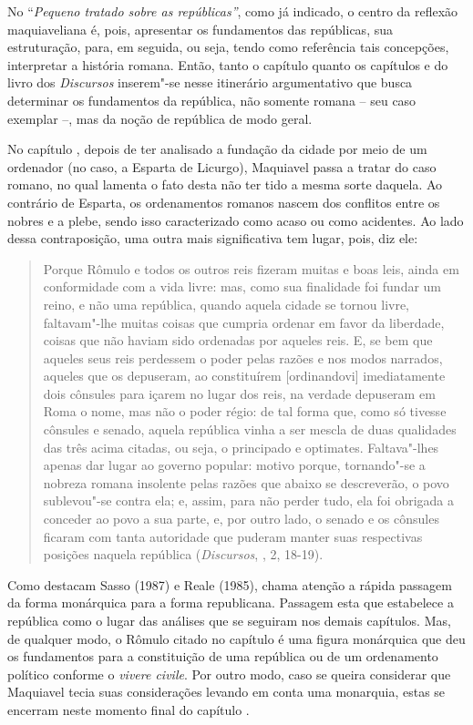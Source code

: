 No ``\emph{Pequeno tratado sobre as repúblicas''}, como já indicado, o
centro da reflexão maquiaveliana é, pois, apresentar os fundamentos das
repúblicas, sua estruturação, para, em seguida, ou seja, tendo como
referência tais concepções, interpretar a história romana. Então, tanto
o capítulo  quanto os capítulos  e  do livro dos \emph{Discursos}
inserem"-se nesse itinerário argumentativo que busca determinar os
fundamentos da república, não somente romana -- seu caso exemplar --,
mas da noção de república de modo geral.

No capítulo , depois de ter analisado a fundação da cidade por meio de
um ordenador (no caso, a Esparta de Licurgo), Maquiavel passa a tratar
do caso romano, no qual lamenta o fato desta não ter tido a mesma sorte
daquela. Ao contrário de Esparta, os ordenamentos romanos nascem dos
conflitos entre os nobres e a plebe, sendo isso caracterizado como acaso
ou como acidentes. Ao lado dessa contraposição, uma outra mais
significativa tem lugar, pois, diz ele:

\begin{quote}
Porque Rômulo e todos os outros reis fizeram muitas e boas leis, ainda
em conformidade com a vida livre: mas, como sua finalidade foi fundar um
reino, e não uma república, quando aquela cidade se tornou livre,
faltavam"-lhe muitas coisas que cumpria ordenar em favor da liberdade,
coisas que não haviam sido ordenadas por aqueles reis. E, se bem que
aqueles seus reis perdessem o poder pelas razões e nos modos narrados,
aqueles que os depuseram, ao constituírem {[}ordinandovi{]}
imediatamente dois cônsules para içarem no lugar dos reis, na verdade
depuseram em Roma o nome, mas não o poder régio: de tal forma que, como
só tivesse cônsules e senado, aquela república vinha a ser mescla de
duas qualidades das três acima citadas, ou seja, o principado e
optimates. Faltava"-lhes apenas dar lugar ao governo popular: motivo
porque, tornando"-se a nobreza romana insolente pelas razões que abaixo
se descreverão, o povo sublevou"-se contra ela; e, assim, para não perder
tudo, ela foi obrigada a conceder ao povo a sua parte, e, por outro
lado, o senado e os cônsules ficaram com tanta autoridade que puderam
manter suas respectivas posições naquela república (\emph{Discursos},
, 2, 18-19).
\end{quote}

Como destacam Sasso (1987) e Reale (1985), chama atenção a rápida
passagem da forma monárquica para a forma republicana. Passagem esta que
estabelece a república como o lugar das análises que se seguiram nos
demais capítulos. Mas, de qualquer modo, o Rômulo citado no capítulo 
é uma figura monárquica que deu os fundamentos para a constituição de
uma república ou de um ordenamento político conforme o \emph{vivere
civile}. Por outro modo, caso se queira considerar que Maquiavel tecia
suas considerações levando em conta uma monarquia, estas se encerram
neste momento final do capítulo .

